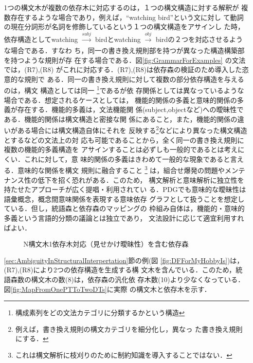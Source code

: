 1つの構文木が複数の依存木に対応するのは，１つの構文構造に対する解釈が
複数存在するような場合であり，例えば，``watching bird''という文に対し
て動詞の現在分詞形が名詞を修飾しているという１つの構文構造をアサインし
た時，依存構造としてwatching ${\xrightarrow[]{subj}}$ birdとwatching
${\xrightarrow[]{obj}}$ birdの２つを対応させるような場合である．すなわ
ち，同一の書き換え規則部を持つが異なった構造構築部を持つような規則が存
在する場合である．図\ref{fig:GrammarForExamples} の文法では，(R7),(R8)
がこれに対応する．(R7),(R8)は依存森の検証のため導入した恣意的な規則で
ある．同一の書き換え規則に対して複数の部分依存構造を与えるのは，構文
構造としては同一
\footnote{構成素列をどの文法カテゴリに分類するかという構造}であるが依
存関係としては異なっているような場合である．想定されるケースとしては，
機能的関係の多義と意味的関係の多義が存在する．機能的多義は，文法機能関
係(subject,objectなど)への曖昧性である．機能的関係は構文構造と密接な関
係にあること，また，機能的関係の違いがある場合には構文構造自体にそれを
反映する\footnote{例えば，書き換え規則の構文カテゴリを細分化し，異なっ
た書き換え規則にする．}などにより異なった構文構造とするなどの文法上の対
応も可能であることから，全く同一の書き換え規則に複数の機能的多義構造を
アサインすることは必ずしも一般的であるとは考えにくい．これに対して，意
味的関係の多義はきわめて一般的な現象であると言える．意味的な関係を構文
規則に融合すること
\footnote{これは構文解析に枝刈りのために制約知識を導入することではない．} 
は，組合せ爆発の問題やメンテナンス性の低下を招く恐れがある．このため，
構文解析と意味解析に独立性を持たせたアプローチが広く提唱・利用されてい
る．PDGでも意味的な曖昧性は語彙概念，概念間意味関係を表現する意味依存
グラフとして扱うことを想定している．但し，統語森と依存森のマッピングの
枠組み自体は，機能的・意味的多義という言語的分類の議論とは独立であり，
文法設計に応じて適宜利用すればよい．

\begin{figure}[b]
\begin{center}
\end{center}
\myfiglabelskip
\caption{N構文木1依存木対応（見せかけ曖昧性）を含む依存森}
\label{fig:DFContainingNtoOneMapping}
\end{figure}

\ref{sec:AmbiguityInStructuralInterpertation}節の例(図
\ref{fig:DFForMyHobbyIs})は，(R7),(R8)により2つの依存構造を生成する構
文木を含んでいる．このため，統語森数の構文木の数(8)は，依存森の汎化依
存木数(10)より少なくなっている．図\ref{fig:MapFromOnePTToTwoDTs}に実際
の構文木と依存木を示す．


